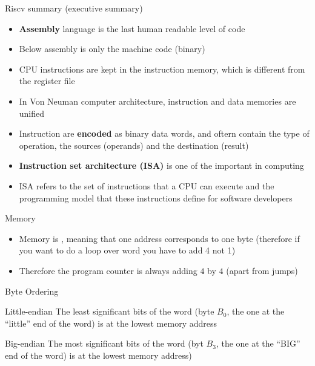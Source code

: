 \begin{parag}{Riscv summary (executive summary)}
    \begin{itemize}
        \item \textbf{Assembly} language is the last human readable level of code
        \item Below assembly is only the machine code (binary)
        \item CPU instructions are kept in the instruction memory, which is different from the register file
        \item In Von Neuman computer architecture, instruction and data memories are unified
        \item Instruction are \textbf{encoded} as binary data words, and oftern contain the type of operation, the sources (operands) and the destination (result)
        \item \textbf{Instruction set architecture (ISA)} is one of the important  in computing
        \item ISA refers to the set of instructions that a CPU can execute and the programming model that these instructions define for software developers
    \end{itemize}
    
\end{parag}
\begin{parag}{Memory}
    \begin{itemize}
        \item Memory is , meaning that one address corresponds to one byte (therefore if you want to do a loop over word you have to add 4 not 1)
        \item Therefore the program counter is always adding $4$ by $4$ (apart from jumps)
    \end{itemize}
    
\end{parag}

\begin{parag}{Byte Ordering}
    \begin{subparag}{Little-endian}
        The least significant bits of the word (byte $B_0$, the one at the ``little'' end of the word) is at the lowest memory address
    \end{subparag}
    \begin{subparag}{Big-endian}
        The most significant bits of the word (byt $B_3$, the one at the ``BIG'' end of the word) is at the lowest memory address)
    \end{subparag}
\end{parag}


